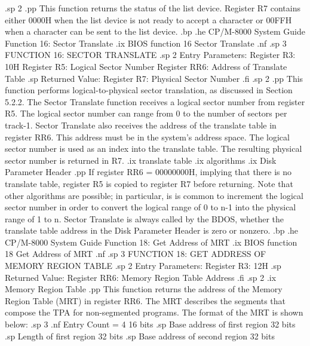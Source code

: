 .sp 2
.pp
This function returns the status of the list device.  Register R7
contains either 0000H when the list device is not ready to accept a character
or 00FFH when a character can be sent to the list device.
.bp
.he CP/M-8000 System Guide              Function 16:  Sector Translate
.ix BIOS function 16 Sector Translate
.nf
.sp 3
                 FUNCTION 16:  SECTOR TRANSLATE
.sp 2
             Entry Parameters:    
                Register R3: 10H
                Register R5: Logical Sector Number
                Register RR6: Address of Translate 
                               Table
.sp
             Returned   Value:  
                Register R7: Physical Sector Number
.fi
.sp 2
.pp
This function performs logical-to-physical sector translation, as discussed
in Section 5.2.2.  
The Sector Translate function receives a logical sector 
number from register R5.
The logical sector number can range from 0 to the number of sectors 
per track-1.
Sector Translate also receives the address of 
the translate table in register RR6.  This address must be in the
system's address space.
The logical sector number is used as an index into the translate table.
The resulting physical sector number is returned in R7.
.ix translate table
.ix algorithms
.ix Disk Parameter Header
.pp
If register RR6 = 00000000H, implying that there is no translate table,
register R5 is copied to register R7 before returning.  Note that
other algorithms are possible; in particular, is is common to increment 
the logical sector number in order to convert the logical range of 0 to n-1
into the physical range of 1 to n.
Sector Translate is always called by the BDOS, whether
the translate table address in the Disk Parameter Header is zero or nonzero.
.bp
.he CP/M-8000 System Guide            Function 18:  Get Address of MRT
.ix BIOS function 18 Get Address of MRT
.nf
.sp 3
               FUNCTION 18:  GET ADDRESS OF MEMORY 
                                 REGION TABLE
.sp 2 
                 Entry Parameters:    
                    Register R3: 12H
.sp
                 Returned   Value:  
                    Register RR6: Memory Region
                                   Table Address
.fi
.sp 2
.ix Memory Region Table
.pp
This function returns the address of the Memory Region Table (MRT) in
register RR6.  The MRT describes the segments that compose the TPA
for non-segmented programs.  The format of the MRT is shown below:
.sp 3
.nf
            Entry Count = 4  16 bits
.sp
            Base address of first region     32 bits
.sp
            Length of first region           32 bits
.sp
            Base address of second region    32 bits
